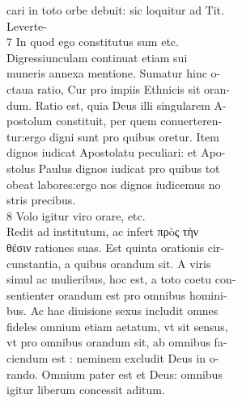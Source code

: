 \documentclass{article}
\begin{document}
\begin{pages}
                cari in toto orbe debuit: sic loquitur ad Tit. \\
                Leverte- \\
                7 In quod ego constitutus sum etc. \\
                Digressiunculam continuat etiam sui \\
                muneris annexa mentione. Sumatur hinc o- \\
                ctaua ratio, Cur pro impiis Ethnicis sit oran- \\
                dum. Ratio est, quia Deus illi singularem A- \\
                postolum constituit, per quem conuerteren- \\
                tur:ergo digni sunt pro quibus oretur. Item \\
                dignos iudicat Apostolatu peculiari: et Apo- \\
                stolus Paulus dignos iudicat pro quibus tot \\
                obeat labores:ergo nos dignos iudicemus no \\
                stris precibus. \\
                8 Volo igitur viro orare, etc. \\
                Redit ad institutum, ac infert πρòς τὴν \\
                θέσιν rationes suas. Est quinta orationis cir- \\
                cunstantia, a quibus orandum sit. A viris \\
                simul ac mulieribus, hoc est, a toto coetu con- \\
                sentienter orandum est pro omnibus homini- \\
                bus. Ac hac diuisione sexus includit omnes \\
                fideles omnium etiam aetatum, vt sit sensus, \\
                vt pro omnibus orandum sit, ab omnibus fa- \\
                ciendum est : neminem excludit Deus in o- \\
                rando. Omnium pater est et Deus: omnibus \\
                igitur liberum concessit aditum. \\

\end{pages}
\end{document}
